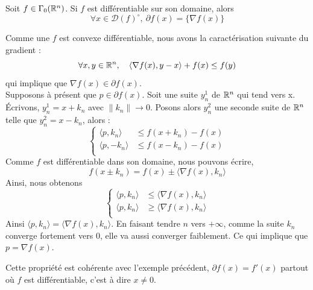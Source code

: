 \documentclass[a4paper,12pt]{article}
\begin{document}
\begin{propriete}
Soit $f\in\Gamma_0(\mathbb{R}^n)$. Si $f$ est différentiable sur son domaine, alors 
$$
\forall x\in \mathcal{D}(f)^{\circ},\ \partial f(x) = \{\nabla f(x)\}
$$
\end{propriete}
\begin{preuve}
Comme une $f$ est convexe différentiable, nous avons la caractérisation suivante du gradient : 
$$
\forall x,y\in\mathbb{R}^n,\quad \langle \nabla f (x) ,y-x\rangle +f(x) \leq f(y)
$$
qui implique que $\nabla f(x) \in\partial f(x)$.\\
Supposons à présent que $p\in\partial f(x)$. Soit une suite $y_n^1$ de $\mathbb{R}^n$ qui tend vers x. Écrivons, $y_n^1=x+k_n$ avec $\|k_n\|\rightarrow 0$. Posons alors $y_n^2$ une seconde suite de $\mathbb{R}^n$ telle que $y_n^2= x-k_n$, alors : 
$$
\left\{
\begin{array}{cc}
\langle p, k_n\rangle &\leq f(x +k_n) - f(x) \\
\langle p,-k_n\rangle & \leq f(x-k_n)-f(x) \\
\end{array}
\right.
$$
Comme $f$ est différentiable dans son domaine, nous pouvons écrire, 
$$
f(x\pm k_n)=f(x) \pm \langle \nabla f(x), k_n\rangle
$$
Ainsi, nous obtenons
$$
\left\{
\begin{array}{cc}
\langle p, k_n\rangle &\leq \langle \nabla f(x), k_n\rangle \\
\langle p, k_n\rangle &\geq \langle \nabla f(x), k_n\rangle \\
\end{array}
\right.
$$
Ainsi $\langle p,k_n \rangle = \langle \nabla f(x),k_n\rangle$. En faisant tendre $n$ vers $+\infty$, comme la suite $k_n$ converge fortement vers $0$, elle va aussi converger faiblement. Ce qui implique que $p=\nabla f(x)$. 
\end{preuve}
Cette propriété est cohérente avec l'exemple précédent, $\partial f(x) =f'(x)$ partout où $f$ est différentiable, c'est à dire $x\neq 0$. 
\end{document}
